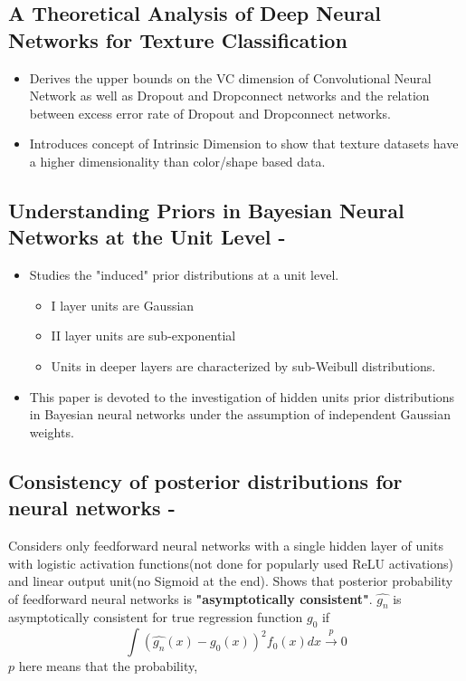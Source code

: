\documentclass[a4paper, twocolumn]{article}
\begin{document}
\subsection{A Theoretical Analysis of Deep Neural Networks for Texture Classification \cite{VC-CNN}}
\label{sec-3-4}
\begin{itemize}
\item Derives the upper bounds on the VC dimension of Convolutional Neural Network as well as Dropout and Dropconnect networks and the relation between excess error rate of Dropout and Dropconnect networks.

\item Introduces concept  of Intrinsic  Dimension to  show  that  texture  datasets  have  a higher dimensionality than color/shape based data.
\end{itemize}

\subsection{Understanding Priors in Bayesian Neural Networks at the Unit Level - \cite{vladimirova2019understanding}}
\label{sec-3-5}
\begin{itemize}
\item Studies the "induced" prior distributions at a unit level. 
\begin{itemize}
\item I layer units are Gaussian
\item II layer units are sub-exponential
\item Units in deeper layers are characterized by sub-Weibull distributions.
\end{itemize}
\item This paper is devoted to the investigation of hidden units prior distributions in Bayesian neural networks under the assumption of independent Gaussian weights.
\end{itemize}

\subsection{Consistency of posterior distributions for neural networks - \cite{lee2000consistency}}
\label{sec-3-6}

Considers only feedforward neural networks with a single hidden layer of units with logistic activation functions(not done for popularly used ReLU activations) and linear output unit(no Sigmoid at the end).
Shows that posterior probability of feedforward neural networks is \textbf{"asymptotically consistent"}. \( \hat{g_n} \) is asymptotically consistent for true regression function \( g_0 \) if
\begin{equation}
    \int (\hat{g_n}(x) - g_0(x))^2f_0(x)dx \xrightarrow{p} 0
\end{equation}
\( p \) here means that the probability, 
\end{document}
